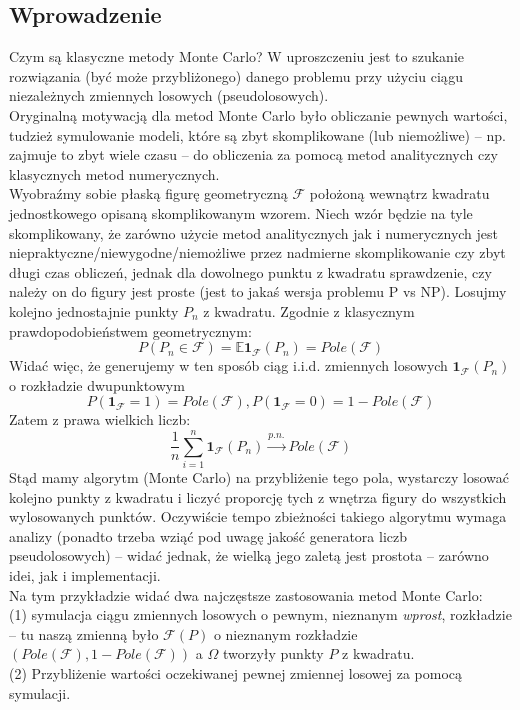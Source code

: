 \documentclass[a4paper]{article}
\theoremstyle{defn}
\theoremstyle{theorem}
\theoremstyle{lemma}
\theoremstyle{cor}
\theoremstyle{fact}
\begin{document}
\subsection{Wprowadzenie}
Czym są klasyczne metody Monte Carlo? W uproszczeniu jest to szukanie rozwiązania (być może przybliżonego) danego problemu przy użyciu ciągu niezależnych zmiennych losowych (pseudolosowych).\\
Oryginalną motywacją dla metod Monte Carlo było obliczanie pewnych wartości, tudzież symulowanie modeli, które są zbyt skomplikowane (lub niemożliwe) – np. zajmuje to zbyt wiele czasu  – do obliczenia za pomocą metod analitycznych czy klasycznych metod numerycznych.
\\

Wyobraźmy sobie płaską figurę geometryczną $\mathcal{F}$ położoną wewnątrz kwadratu jednostkowego opisaną skomplikowanym wzorem.
Niech wzór będzie na tyle skomplikowany, że zarówno użycie metod analitycznych jak i numerycznych jest niepraktyczne/niewygodne/niemożliwe przez nadmierne skomplikowanie czy zbyt długi czas obliczeń, jednak dla dowolnego punktu z kwadratu sprawdzenie, czy należy on do figury jest proste (jest to jakaś wersja problemu P vs NP). Losujmy kolejno jednostajnie punkty $P_n$ z kwadratu. Zgodnie z klasycznym prawdopodobieństwem geometrycznym: $$P(P_n \in \mathcal{F}) = \mathbb{E}\mathbf{1}_{\mathcal{F}}(P_n) = Pole(\mathcal{F})$$
Widać więc, że generujemy w ten sposób ciąg i.i.d. zmiennych losowych $\mathbf{1}_{\mathcal{F}}(P_n)$ o rozkładzie dwupunktowym $$P(\mathbf{1}_{\mathcal{F}} = 1) = Pole(\mathcal{F}), P(\mathbf{1}_{\mathcal{F}} = 0) = 1 - Pole(\mathcal{F})$$
Zatem z prawa wielkich liczb:
$$\frac{1}{n} \sum\limits_{i=1}^n \mathbf{1}_{\mathcal{F}}(P_n) \overset{p.n.}{\to} Pole(\mathcal{F})$$
Stąd mamy algorytm (Monte Carlo) na przybliżenie tego pola, wystarczy losować kolejno punkty z kwadratu i liczyć proporcję tych z wnętrza figury do wszystkich wylosowanych punktów. Oczywiście tempo zbieżności takiego algorytmu wymaga analizy (ponadto trzeba wziąć pod uwagę jakość generatora liczb pseudolosowych) – widać jednak, że wielką jego zaletą jest prostota – zarówno idei, jak i implementacji.
\\

Na tym przykładzie widać dwa najczęstsze zastosowania metod Monte Carlo:\\
(1) symulacja ciągu zmiennych losowych o pewnym, nieznanym \textit{wprost}, rozkładzie – tu naszą zmienną było $\mathcal{F}(P)$ o nieznanym rozkładzie $(Pole(\mathcal{F}), 1 - Pole(\mathcal{F}))$ a $\Omega$ tworzyły punkty $P$ z kwadratu.\\
(2) Przybliżenie wartości oczekiwanej pewnej zmiennej losowej za pomocą symulacji.
\\
\end{document}
